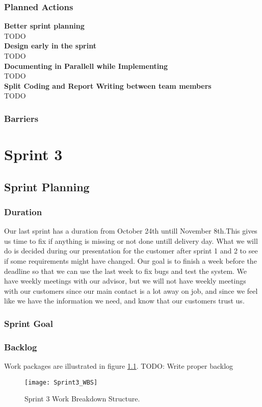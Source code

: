 \documentclass{report}
\begin{document}
\subsection{Planned Actions} \label{subsec:planned_act2}
\textbf{Better sprint planning}\\
TODO\\
\textbf{Design early in the sprint}\\
TODO\\
\textbf{Documenting in Parallell while Implementing}\\
TODO\\
\textbf{Split Coding and Report Writing between team members}\\
TODO
\subsection{Barriers} \label{subsec:barriers2}

\chapter{Sprint 3} \label{cha:sprint_3}
\newpage
\section{Sprint Planning} \label{sec:sprint_planning3}
\subsection{Duration} \label{subsec:duration3}
Our last sprint has a duration from October 24th untill November 8th.This gives us time to fix if anything is missing or not done untill delivery day. What we will do is decided during our presentation for the customer after sprint 1 and 2 to see if some requirements might have changed. Our goal is to finish a week before the deadline so that we can use the last week to fix bugs and test the system. We have weekly meetings with our advisor, but we will not have weekly meetings with our customers since our main contact is a lot away on job, and since we feel like we have the information we need, and know that our customers trust us.
\subsection{Sprint Goal} \label{subsec:sprint_goal3}
\subsection{Backlog} \label{subsec:backlog} %
Work packages are illustrated in figure \ref{fig:sprint3_WBS}.
TODO: Write proper backlog
\begin{figure}
    \centering
    \texttt{[image: Sprint3\_WBS]}
    \caption{Sprint 3 Work Breakdown Structure.  \label{fig:sprint3_WBS}}
\end{figure}
\newpage
\end{document}
